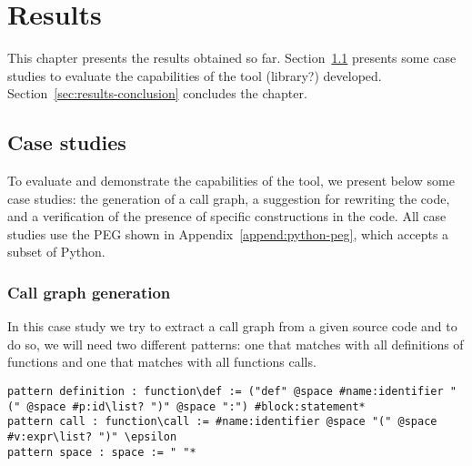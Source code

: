 \chapter{Results}\label{chap:results}

This chapter presents the results obtained so far. Section~\ref{sec:case-studies} 
presents some case studies to evaluate the capabilities of the tool (library?) developed.
Section~\ref{sec:results-conclusion} concludes the chapter.

\section{Case studies}\label{sec:case-studies}

To evaluate and demonstrate the capabilities of the tool, we present below
some case studies: the generation of a call graph, a suggestion for rewriting 
the code, and a verification of the presence of specific constructions in the 
code. All case studies use the PEG shown in Appendix~\ref{append:python-peg},
which accepts a subset of Python.

\subsection{Call graph generation}

In this case study we try to extract a call graph from a given source code
and to do so, we will need two different patterns: one that matches with all
definitions of functions and one that matches with all functions calls.

\begin{verbatim}
pattern definition : function\def := ("def" @space #name:identifier "(" @space #p:id\list? ")" @space ":") #block:statement*
pattern call : function\call := #name:identifier @space "(" @space #v:expr\list? ")" \epsilon
pattern space : space := " "*
\end{verbatim}

